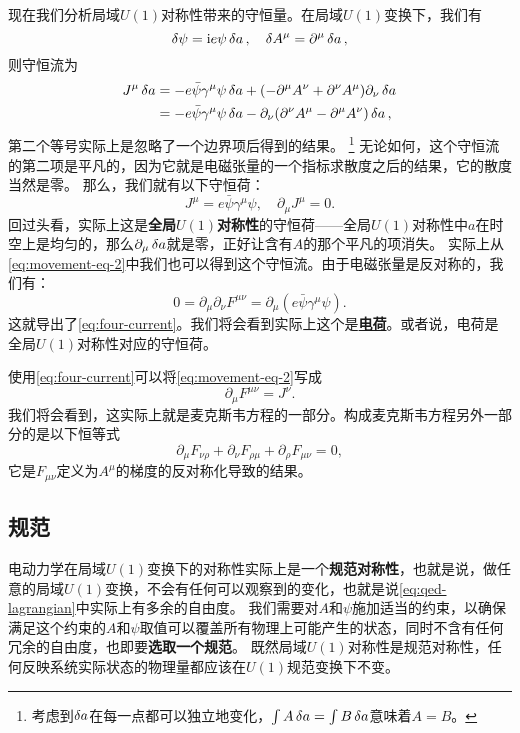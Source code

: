 \documentclass[UTF8, a4paper]{ctexart}
\newcommand*{\ii}{\mathrm{i}}
\renewcommand{\emph}[1]{\textbf{#1}}
\newcommand*{\concept}[1]{\underline{\textbf{#1}}}
\begin{document}
现在我们分析局域$U(1)$对称性带来的守恒量。在局域$U(1)$变换下，我们有
\[
    \var{\psi} = \ii e \psi \var{a}, \quad \var{A^\mu} = \partial^\mu \var{a},
\]
则守恒流为
\[
    \begin{aligned}
        J^\mu \var{a} &= - e \bar{\psi} \gamma^\mu \psi \var{a} + (-\partial^\mu A^\nu + \partial^\nu A^\mu) \partial_\nu \var{a} \\
        &= - e \bar{\psi} \gamma^\mu \psi \var{a} - \partial_\nu (\partial^\nu A^\mu - \partial^\mu A^\nu) \var{a},
    \end{aligned}
\]
第二个等号实际上是忽略了一个边界项后得到的结果。%
\footnote{考虑到$\var{a}$在每一点都可以独立地变化，$\int A\var{a} = \int B \var{a}$意味着$A=B$。}%
无论如何，这个守恒流的第二项是平凡的，因为它就是电磁张量的一个指标求散度之后的结果，它的散度当然是零。
那么，我们就有以下守恒荷：
\begin{equation}
    J^\mu = e \bar{\psi} \gamma^\mu \psi , \quad \partial_\mu J^\mu = 0.
    \label{eq:four-current}
\end{equation}
回过头看，实际上这是\emph{全局$U(1)$对称性}的守恒荷——全局$U(1)$对称性中$a$在时空上是均匀的，那么$\partial_\mu \var{a}$就是零，正好让含有$A$的那个平凡的项消失。
实际上从\eqref{eq:movement-eq-2}中我们也可以得到这个守恒流。由于电磁张量是反对称的，我们有：
\[
    0 = \partial_\mu \partial_\nu F^{\mu \nu} = \partial_\mu (e \bar{\psi} \gamma^\mu \psi).
\]
这就导出了\eqref{eq:four-current}。我们将会看到实际上这个是\concept{电荷}。或者说，电荷是全局$U(1)$对称性对应的守恒荷。

使用\eqref{eq:four-current}可以将\eqref{eq:movement-eq-2}写成
\begin{equation}
    \partial_\mu F^{\mu \nu} = J^\nu.
    \label{eq:four-maxwell}
\end{equation}
我们将会看到，这实际上就是麦克斯韦方程的一部分。构成麦克斯韦方程另外一部分的是以下恒等式
\begin{equation}
    \partial_\mu F_{\nu \rho} + \partial_\nu F_{\rho \mu} + \partial_\rho F_{\mu \nu} = 0,
    \label{eq:bianchi-identity}
\end{equation}
它是$F_{\mu \nu}$定义为$A^\mu$的梯度的反对称化导致的结果。

\subsection{规范}\label{sec:gauge-def}

电动力学在局域$U(1)$变换下的对称性实际上是一个\emph{规范对称性}，也就是说，做任意的局域$U(1)$变换，不会有任何可以观察到的变化，也就是说\eqref{eq:qed-lagrangian}中实际上有多余的自由度。
我们需要对$A$和$\psi$施加适当的约束，以确保满足这个约束的$A$和$\psi$取值可以覆盖所有物理上可能产生的状态，同时不含有任何冗余的自由度，也即要\emph{选取一个规范}。
既然局域$U(1)$对称性是规范对称性，任何反映系统实际状态的物理量都应该在$U(1)$规范变换下不变。
\end{document}

